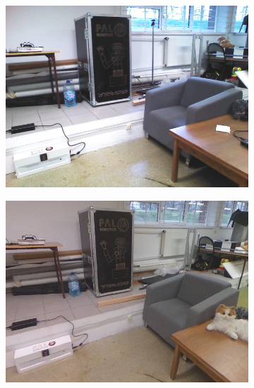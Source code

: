 \documentclass{svproc}
\begin{document}
\begin{figure}[!ht]
\begin{subfigure}{0.46\textwidth}
        \caption{}
        \vspace*{1em}
    \end{subfigure}
    \begin{subfigure}{0.46\textwidth}
        \centering
        \includegraphics[width=\linewidth]{img/sim_vs_tiago/tia_fotel.jpg}
        \caption{}
        \vspace*{1em}
    \end{subfigure}\hfill%
    \begin{subfigure}{0.46\textwidth}
        \centering
        \includegraphics[width=\linewidth]{img/sim_vs_tiago/sim_fotel.jpg}
        \caption{}
        \vspace*{1em}
    \end{subfigure}

\end{figure}
\end{document}
